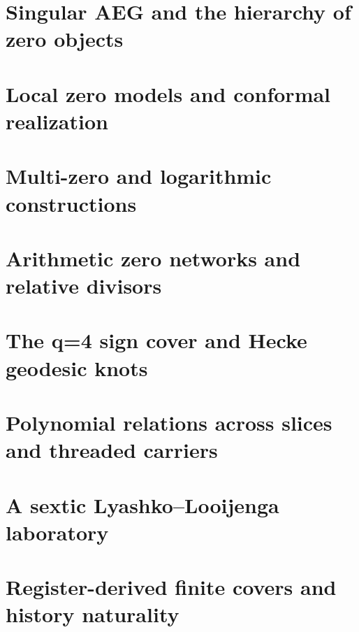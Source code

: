 \documentclass[11pt]{article}
\theoremstyle{definition}
\theoremstyle{remark}
\begin{document}
\setcounter{tocdepth}{2}
\tableofcontents
\newpage

\section{Singular AEG and the hierarchy of zero objects}
\label{sec:singular-aeg}


\section{Local zero models and conformal realization}
\label{sec:local-zero-models}


\section{Multi-zero and logarithmic constructions}
\label{sec:multi-zero}


\section{Arithmetic zero networks and relative divisors}
\label{sec:arithmetic-zero-networks}


\section{The q=4 sign cover and Hecke geodesic knots}
\label{sec:q4-geodesic-knots}


\section{Polynomial relations across slices and threaded carriers}
\label{sec:polynomial-threaded-carriers}


\section{A sextic Lyashko--Looijenga laboratory}
\label{sec:sextic-ll-laboratory}


\section{Register-derived finite covers and history naturality}
\label{sec:history-divisor-naturality}

\end{document}
